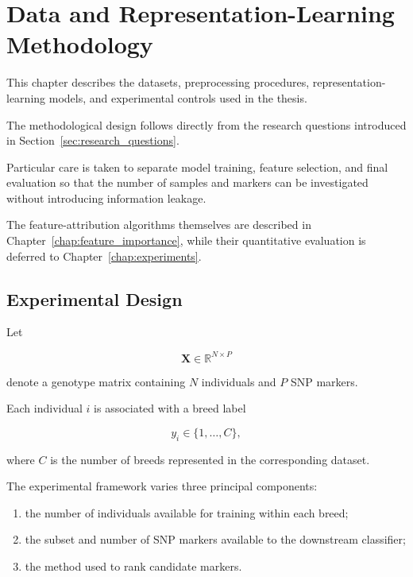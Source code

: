 \chapter{Data and Representation-Learning Methodology}
\label{chap:methods}

\label{chap:latent_representations}

This chapter describes the datasets, preprocessing procedures,
representation-learning models, and experimental controls used in
the thesis.

The methodological design follows directly from the research
questions introduced in
Section~\ref{sec:research_questions}.

Particular care is taken to separate model training, feature
selection, and final evaluation so that the number of samples and
markers can be investigated without introducing information leakage.

The feature-attribution algorithms themselves are described in
Chapter~\ref{chap:feature_importance}, while their quantitative
evaluation is deferred to Chapter~\ref{chap:experiments}.


\section{Experimental Design}
\label{sec:experimental_design}

Let

\begin{equation}
    \mathbf{X}
    \in
    \mathbb{R}^{N \times P}
\end{equation}

denote a genotype matrix containing $N$ individuals and $P$ SNP
markers.

Each individual $i$ is associated with a breed label

\begin{equation}
    y_i
    \in
    \{1,\ldots,C\},
\end{equation}

where $C$ is the number of breeds represented in the corresponding
dataset.

The experimental framework varies three principal components:

\begin{enumerate}

    \item the number of individuals available for training within
    each breed;

    \item the subset and number of SNP markers available to the
    downstream classifier;

    \item the method used to rank candidate markers.

\end{enumerate}


